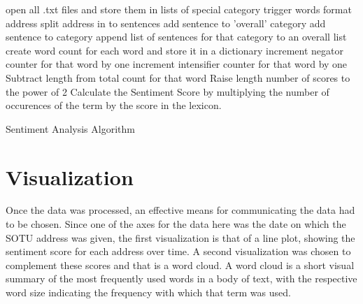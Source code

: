 \documentclass[acmtog, review, screen]{acmart}
\begin{document}
\begin{algorithm}[t]
\SetAlgoNoLine
{}
open all .txt files and store them in lists of special category trigger words\;
	{format address
	split address in to sentences
		{add sentence to 'overall' category
		{add sentence to category}
		{append list of sentences for that category to an overall list}
		{
			{create word count for each word and store it in a dictionary\;
				{increment negator counter for that word by one}
				{increment intensifier counter for that word by one}
			}
		{
		{
		{Subtract length from total count for that word}
		}
		{Raise length number of scores to the power of 2}
		Calculate the Sentiment Score by multiplying the number of occurences of the term by the score in the lexicon.
		}
		}
	}
	}
	
\caption{Sentiment Analysis Algorithm}
\label{alg:one}
\end{algorithm}

\section{Visualization}
Once the data was processed, an effective means for communicating the data had to be chosen.
Since one of the axes for the data here was the date on which the SOTU address was given, the first visualization is that of a line plot, showing the sentiment score for each address over time.
A second visualization was chosen to complement these scores and that is a word cloud.
A word cloud is a short visual summary of the most frequently used words in a body of text, with the respective word size indicating the frequency with which that term was used.
\end{document}
